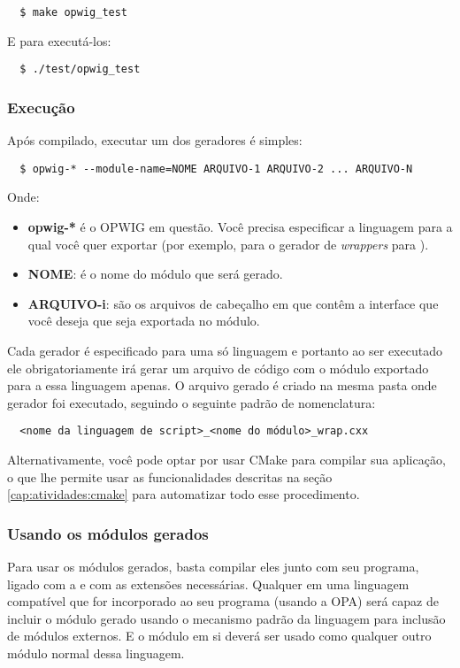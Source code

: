 \begin{verbatim}
  $ make opwig_test
\end{verbatim}

E para executá-los:

\begin{verbatim}
  $ ./test/opwig_test
\end{verbatim}

\subsubsection{Execução}

Após compilado, executar um dos geradores é simples:
\begin{verbatim}
  $ opwig-* --module-name=NOME ARQUIVO-1 ARQUIVO-2 ... ARQUIVO-N
\end{verbatim}

Onde:
\begin{itemize}
  \item \textbf{opwig-*} é o OPWIG em questão. Você precisa especificar a
        linguagem para a qual você quer exportar (por exemplo, 
        para o gerador de \textit{wrappers} para ).
  \item \textbf{NOME}: é o nome do módulo que será gerado.
  \item \textbf{ARQUIVO-i}: são os arquivos de cabeçalho em \CXX{} que contêm a interface
        que você deseja que seja exportada no módulo.
\end{itemize}

Cada gerador é especificado para uma só linguagem e portanto ao ser executado
ele obrigatoriamente irá gerar um arquivo de código com o módulo exportado para a
essa linguagem apenas. O arquivo gerado é criado na mesma pasta onde gerador foi
executado, seguindo o seguinte padrão de nomenclatura:
\begin{verbatim}
  <nome da linguagem de script>_<nome do módulo>_wrap.cxx
\end{verbatim}

Alternativamente, você pode optar por usar CMake para compilar sua aplicação, o que
lhe permite usar as funcionalidades descritas na seção \ref{cap:atividades:cmake}
para automatizar todo esse procedimento.

\subsubsection{Usando os módulos gerados}

Para usar os módulos gerados, basta compilar eles junto com seu programa, ligado com
a  e com as extensões necessárias. Qualquer \script{} em uma
linguagem compatível que for incorporado ao seu programa (usando a OPA) será
capaz de incluir o módulo gerado usando o mecanismo padrão da linguagem para
inclusão de módulos externos. E o módulo em si deverá ser usado como qualquer
outro módulo normal dessa linguagem.

